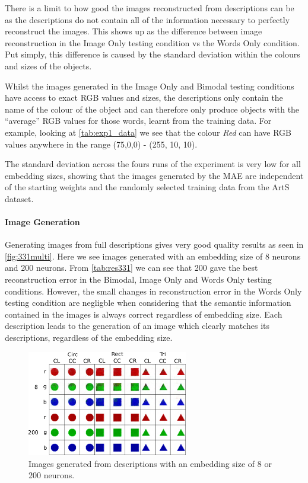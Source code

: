 There is a limit to how good the images reconstructed from descriptions can be as the descriptions do not contain all of the information necessary to perfectly reconstruct the images. This shows up as the difference between image reconstruction in the Image Only testing condition vs the Words Only condition. Put simply, this difference is caused by the standard deviation within the colours and sizes of the objects. 

Whilst the images generated in the Image Only and Bimodal testing conditions have access to exact \ac{RGB} values and sizes, the descriptions only contain the name of the colour of the object and can therefore only produce objects with the ``average'' \ac{RGB} values for those words, learnt from the training data. For example, looking at \autoref{tab:exp1_data} we see that the colour \textit{Red} can have RGB values anywhere in the range (75,0,0) - (255, 10, 10).

The standard deviation across the fours runs of the experiment is very low for all embedding sizes, showing that the images generated by the \ac{MAE} are independent of the starting weights and the randomly selected training data from the ArtS dataset. 

\paragraph{Image Generation}

Generating images from full descriptions gives very good quality results as seen in \autoref{fig:331multi}. Here we see images generated with an embedding size of 8 neurons and 200 neurons. From \autoref{tab:res331} we can see that 200 gave the best reconstruction error in the Bimodal, Image Only and Words Only testing conditions. However, the small changes in reconstruction error in the Words Only testing condition are negligble when considering that the semantic information contained in the images is always correct regardless of embedding size. Each description leads to the generation of an image which clearly matches its descriptions, regardless of the embedding size. 

\begin{figure}
\centering
\includegraphics[width=0.625\textwidth]{Figs/shapes/331_8v200.png}
\caption{Images generated from descriptions with an embedding size of 8 or 200 neurons.}
\label{fig:331multi}
\end{figure}

